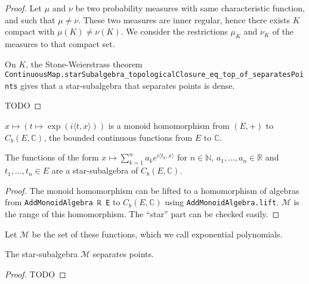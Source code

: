 \begin{proof}
Let $\mu$ and $\nu$ be two probability measures with same characteristic function, and such that $\mu \ne \nu$.
These two measures are inner regular, hence there exists $K$ compact with $\mu(K) \ne \nu(K)$.
We consider the restrictions $\mu_K$ and $\nu_K$ of the measures to that compact set.

On $K$, the Stone-Weierstrass theorem \texttt{ContinuousMap.starSubalgebra\_topologicalClosure\_eq\_top\_of\_separatesPoints} gives that a star-subalgebra that separates points is dense.

TODO
\end{proof}

\begin{lemma}\label{lem:exp_character}
$x \mapsto (t \mapsto \exp(i \langle t, x \rangle))$ is a monoid homomorphism from $(E,+)$ to $C_b(E, \mathbb{C})$, the bounded continuous functions from $E$ to $\mathbb{C}$.
\end{lemma}

\begin{lemma}\label{lem:starSubalgebra_expPoly}
The functions of the form $x \mapsto \sum_{k=1}^n a_k e^{i\langle t_k, x\rangle}$ for $n \in \mathbb{N}$, $a_1, \ldots, a_n \in \mathbb{R}$ and $t_1, \ldots, t_n \in E$ are a star-subalgebra of $C_b(E, \mathbb{C})$. 
\end{lemma}

\begin{proof}
The monoid homomorphism can be lifted to a homomorphism of algebras from \texttt{AddMonoidAlgebra ℝ E} to $C_b(E, \mathbb{C})$ using \texttt{AddMonoidAlgebra.lift}. $\mathcal M$ is the range of this homomorphism. The ``star'' part can be checked easily.
\end{proof}

Let $\mathcal M$ be the set of these functions, which we call exponential polynomials.

\begin{lemma}\label{lem:separating_expPoly}
The star-subalgebra $\mathcal M$ separates points.
\end{lemma}

\begin{proof}
TODO
\end{proof}


